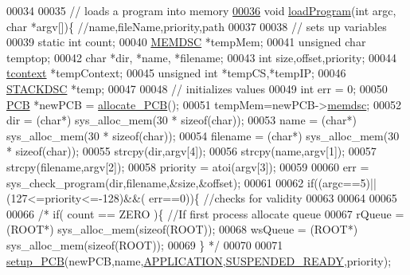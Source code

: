 \begin{DoxyCode}
00034 
00035 \textcolor{comment}{// loads a program into memory}
\hypertarget{mpx__r4_8c_source_l00036}{}\hyperlink{mpx__r4_8h_a794e5f6c45d4d9b18fff6a530ce90f86}{00036} \textcolor{keywordtype}{void} \hyperlink{mpx__r4_8c_a794e5f6c45d4d9b18fff6a530ce90f86}{loadProgram}(\textcolor{keywordtype}{int} argc, \textcolor{keywordtype}{char} *argv[])\{ \textcolor{comment}{//name,fileName,priority,path}
00037         
00038         \textcolor{comment}{// sets up variables}
00039         \textcolor{keyword}{static} \textcolor{keywordtype}{int} count;
00040         \hyperlink{structmem}{MEMDSC} *tempMem;
00041         \textcolor{keywordtype}{unsigned} \textcolor{keywordtype}{char} temptop;
00042         \textcolor{keywordtype}{char} *dir, *name, *filename;
00043         \textcolor{keywordtype}{int} size,offset,priority;
00044         \hyperlink{structcontext}{tcontext} *tempContext;
00045         \textcolor{keywordtype}{unsigned} \textcolor{keywordtype}{int} *tempCS,*tempIP;
00046         \hyperlink{structstack}{STACKDSC} *temp;
00047         
00048         \textcolor{comment}{// initializes values}
00049         \textcolor{keywordtype}{int} err = 0;
00050         \hyperlink{structprocess}{PCB} *newPCB = \hyperlink{mpx__r2_8c_a58a8a1ea0a96b9ecf0be29179a5a0a1e}{allocate_PCB}();
00051         tempMem=newPCB->\hyperlink{structprocess_a163551ab7b60184b48e5d440fcd5c2b8}{memdsc};
00052         dir = (\textcolor{keywordtype}{char}*) sys\_alloc\_mem(30 * \textcolor{keyword}{sizeof}(\textcolor{keywordtype}{char}));
00053         name = (\textcolor{keywordtype}{char}*) sys\_alloc\_mem(30 * \textcolor{keyword}{sizeof}(\textcolor{keywordtype}{char}));
00054         filename = (\textcolor{keywordtype}{char}*) sys\_alloc\_mem(30 * \textcolor{keyword}{sizeof}(\textcolor{keywordtype}{char}));
00055         strcpy(dir,argv[4]);
00056         strcpy(name,argv[1]);
00057         strcpy(filename,argv[2]);
00058         priority = atoi(argv[3]);
00059         
00060         err = sys\_check\_program(dir,filename,&size,&offset); 
00061         
00062         \textcolor{keywordflow}{if}((argc==5)||(127<=priority<=-128)&&( err==0))\{ \textcolor{comment}{//checks for validity}
00063                 
00064                 
00065 
00066               \textcolor{comment}{/*        if( count == ZERO )\{ //If first process allocate queue}
00067 \textcolor{comment}{                        rQueue = (ROOT*) sys\_alloc\_mem(sizeof(ROOT));}
00068 \textcolor{comment}{                        wsQueue = (ROOT*) sys\_alloc\_mem(sizeof(ROOT));}
00069 \textcolor{comment}{                \}   */}
00070 
00071                 \hyperlink{mpx__r2_8c_a316c9619aba53c03c17afbc0a0dbf096}{setup_PCB}(newPCB,name,\hyperlink{mpx__r2_8h_a796bd7c6ba2e59281760fb155c6287e8}{APPLICATION},\hyperlink{mpx__r2_8h_a07b1141143e8825b04670da23fca8cc7}{SUSPENDED_READY},priority);

\end{DoxyCode}
